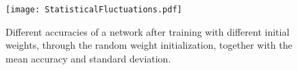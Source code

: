 \begin{figure}[H]
\centering
\texttt{[image: StatisticalFluctuations.pdf]}
\caption{Different accuracies of a network after training with different initial weights, through the random weight initialization, together with the mean accuracy and standard deviation.}
\label{fig:AccuracyFluctuation}
\end{figure}


















